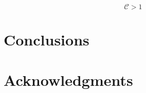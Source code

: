 \documentclass[a4,useAMS,usenatbib,usegraphicx]{latex/mn2e}
\begin{document}
\[ \mathcal{C} > 1 \]


\section{Conclusions}
\label{sec:conclusions}


\section*{Acknowledgments}  








  


\end{document}
